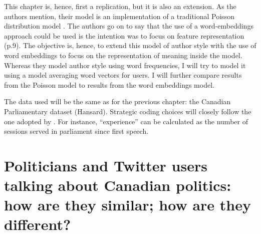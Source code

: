 \documentclass[
  openany]{book}
\begin{document}
This chapter is, hence, first a replication, but it is also an extension. As the authors mention, their model is an implementation of a traditional Poisson distribution model \citep{mosteller1963inference}. The authors go on to say that the use of a word-embeddings approach could be used is the intention was to focus on feature representation (p.9). The objective is, hence, to extend this model of author style with the use of word embeddings to focus on the representation of meaning inside the model. Whereas they model author style using word frequencies, I will try to model it using a model averaging word vectors for users. I will further compare results from the Poisson model to results from the word embeddings model.

The data used will be the same as for the previous chapter: the Canadian Parliamentary dataset (Hansard). Strategic coding choices will closely follow the one adopted by \citet{huang2020general}. For instance, ``experience'' can be calculated as the number of sessions served in parliament since first speech.

\hypertarget{politicians-and-twitter-users-talking-about-canadian-politics-how-are-they-similar-how-are-they-different}{%
\chapter{Politicians and Twitter users talking about Canadian politics: how are they similar; how are they different?}\label{politicians-and-twitter-users-talking-about-canadian-politics-how-are-they-similar-how-are-they-different}}
\end{document}
